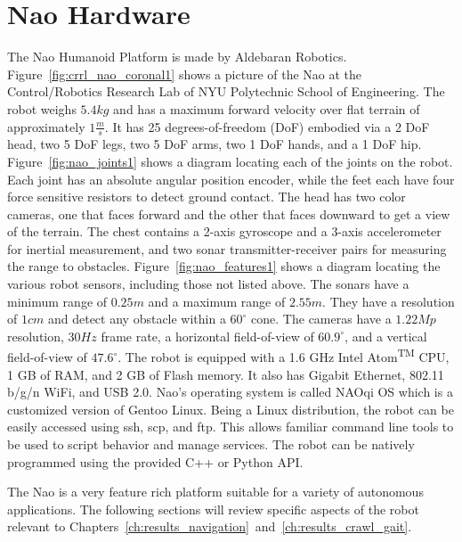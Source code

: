 \section{Nao Hardware}
The Nao Humanoid Platform is made by Aldebaran Robotics. 
Figure~\ref{fig:crrl_nao_coronal1} shows a picture of the Nao at the
Control/Robotics Research Lab of NYU Polytechnic School of Engineering.
The robot weighs $5.4 kg$ and has a maximum forward velocity over flat
terrain of approximately $1 \frac{m}{s}$.
It has 25 degrees-of-freedom (DoF) embodied via a 2 DoF head, two 5 DoF legs,
two 5 DoF arms, two 1 DoF hands, and a 1 DoF hip.
Figure~\ref{fig:nao_joints1} shows a diagram locating each of the joints on
the robot.
Each joint has an absolute angular position encoder, while the feet each have
four force sensitive resistors to detect ground contact.
The head has two color cameras, one that faces forward and the other that faces
downward to get a view of the terrain. The chest contains a 2-axis gyroscope and
a 3-axis accelerometer for inertial measurement, and two sonar transmitter-receiver
pairs for measuring the range to obstacles.
Figure~\ref{fig:nao_features1} shows a diagram locating the various robot sensors,
including those not listed above.
The sonars have a minimum range of $0.25 m$ and a maximum range of $2.55 m$.
They have a resolution of $1 cm$ and detect any obstacle within a $60^\circ$
cone. The cameras have a $1.22 Mp$ resolution, $30 Hz$ frame rate,
a horizontal field-of-view of $60.9^\circ$, and a vertical field-of-view of
$47.6^\circ$.
The robot is equipped with a 1.6 GHz Intel\textsuperscript{\textregistered}
Atom\textsuperscript{TM} CPU, 1 GB of RAM, and 2 GB of Flash memory.
It also has Gigabit Ethernet, 802.11 b/g/n WiFi, and USB 2.0. 
Nao's operating system is called NAOqi OS which is a customized version of
Gentoo Linux. Being a Linux distribution, the robot can be easily accessed
using ssh, scp, and ftp. This allows familiar command line tools to be used
to script behavior and manage services.
The robot can be natively programmed using the provided C++ or Python API.

The Nao is a very feature rich platform suitable for a variety of autonomous
applications. The following sections will review specific aspects of the robot
relevant to Chapters~\ref{ch:results_navigation}~and~\ref{ch:results_crawl_gait}.


